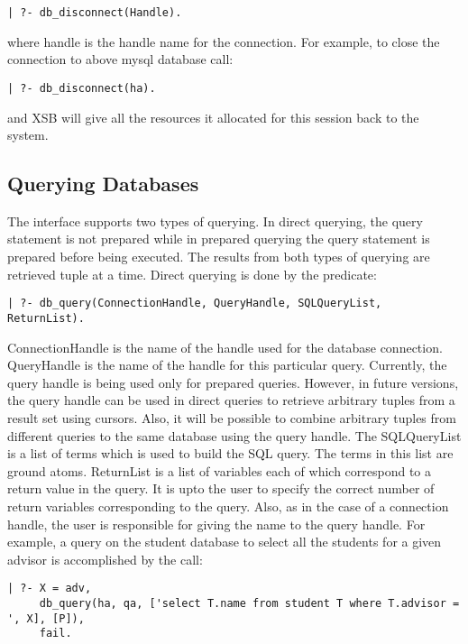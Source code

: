 \begin{verbatim}
| ?- db_disconnect(Handle).
\end{verbatim}

\noindent
where handle is the handle name for the connection. For example, 
to close the connection to above mysql database call:

\begin{verbatim}
| ?- db_disconnect(ha).
\end{verbatim}

and XSB will give all the resources it allocated for this session back
to the system.


\subsection{Querying Databases}

The interface supports two types of querying. In direct querying, the
query statement is not prepared while in prepared querying the query
statement is prepared before being executed. The results from
both types of querying are retrieved tuple at a time.
Direct querying is done by the predicate:

\begin{verbatim}
| ?- db_query(ConnectionHandle, QueryHandle, SQLQueryList, ReturnList).
\end{verbatim}

ConnectionHandle is the name of the handle used for the database connection.
QueryHandle is the name of the handle for this particular query. 
Currently, the query handle is being used only for prepared queries. 
However, in future versions, the query handle can be used in direct
queries to retrieve arbitrary tuples from a result set using cursors.
Also, it will be possible to combine arbitrary tuples from different 
queries to the same database using the query handle.
The SQLQueryList is a list of terms which is used to build the SQL query.
The terms in this list are ground atoms. ReturnList is a list of 
variables each of which correspond to a return value in the query.
It is upto the user to specify the correct number of return variables 
corresponding to the query. Also, as in the case of a connection handle, 
the user is responsible for giving the name to the query handle.
For example, a query on the student database to select all the students
for a given advisor is accomplished by the call:

\begin{verbatim}
| ?- X = adv,
     db_query(ha, qa, ['select T.name from student T where T.advisor = ', X], [P]),
     fail.
\end{verbatim}

